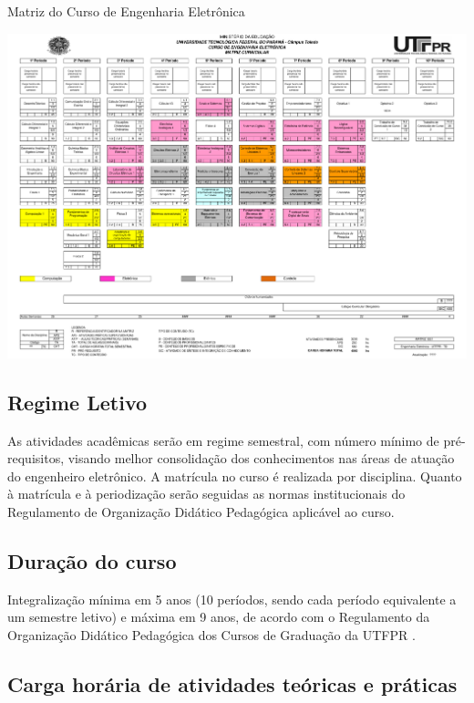 \begin{landscape}
	\begin{quadro}
		\centering
		\caption{Matriz do Curso de Engenharia Eletrônica}
		\includegraphics[width=1.3\textwidth]{Caps/Figs/NovaMatriz.pdf}
		\fonte{\utf}
		\label{qua:matriz}
	\end{quadro}
\end{landscape}

\subsection{Regime Letivo}
\label{sub:reg}

As atividades acadêmicas serão em regime semestral, com número mínimo de pré-requisitos, visando melhor consolidação dos conhecimentos nas áreas de atuação do engenheiro eletrônico. A matrícula no curso é realizada por disciplina. Quanto à matrícula e à periodização serão seguidas as normas institucionais do Regulamento de Organização Didático Pedagógica aplicável ao curso.

\subsection{Duração do curso}

Integralização mínima em 5 anos (10 períodos, sendo cada período equivalente a um semestre letivo) e máxima em 9 anos, de acordo com o Regulamento da Organização Didático Pedagógica dos Cursos de Graduação da UTFPR \cite{rodp}.

\subsection{Carga horária de atividades teóricas e práticas}

